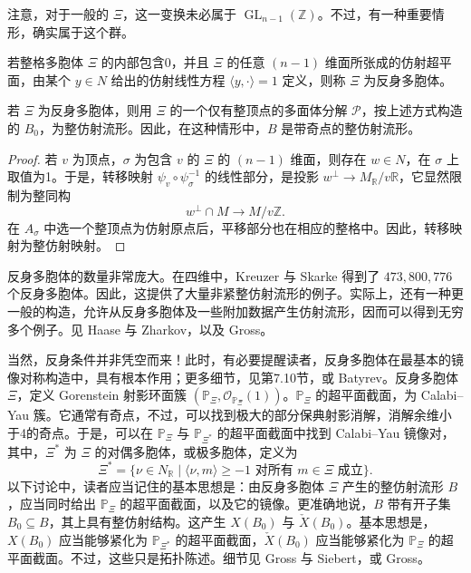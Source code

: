 注意，对于一般的 $\Xi$，这一变换未必属于 $\operatorname{GL}_{n-1}(\mathbb Z)$。不过，有一种重要情形，确实属于这个群。

\begin{definition}\label{def:6.80}
若整格多胞体 $\Xi$ 的内部包含0，并且 $\Xi$ 的任意 $(n-1)$ 维面所张成的仿射超平面，由某个 $y\in N$ 给出的仿射线性方程 $\langle y,\cdot\rangle=1$ 定义，则称 $\Xi$ 为反身多胞体。
\end{definition}

\begin{proposition}\label{prop:6.81}
若 $\Xi$ 为反身多胞体，则用 $\Xi$ 的一个仅有整顶点的多面体分解 $\mathcal P$，按上述方式构造的 $B_0$，为整仿射流形。因此，在这种情形中，$B$ 是带奇点的整仿射流形。
\end{proposition}
\begin{proof}
若 $v$ 为顶点，$\sigma$ 为包含 $v$ 的 $\Xi$ 的 $(n-1)$ 维面，则存在 $w\in N$，在 $\sigma$ 上取值为1。于是，转移映射 $\psi_v\circ\psi_\sigma^{-1}$ 的线性部分，是投影 $w^\perp\to M_{\mathbb R}/v\mathbb R$，它显然限制为整同构
\[
w^\perp\cap M\longrightarrow M/v\mathbb Z.
\]
在 $A_\sigma$ 中选一个整顶点为仿射原点后，平移部分也在相应的整格中。因此，转移映射为整仿射映射。
\end{proof}

反身多胞体的数量非常庞大。在四维中，Kreuzer 与 Skarke 得到了 $473{,}800{,}776$ 个反身多胞体。因此，这提供了大量非紧整仿射流形的例子。实际上，还有一种更一般的构造，允许从反身多胞体及一些附加数据产生仿射流形，因而可以得到无穷多个例子。见 Haase 与 Zharkov，以及 Gross。

当然，反身条件并非凭空而来！此时，有必要提醒读者，反身多胞体在最基本的镜像对称构造中，具有根本作用；更多细节，见第7.10节，或 Batyrev。反身多胞体 $\Xi$，定义 Gorenstein 射影环面簇 $(\mathbb P_\Xi,\mathcal O_{\mathbb P_\Xi}(1))$。$\mathbb P_\Xi$ 的超平面截面，为 Calabi--Yau 簇。它通常有奇点，不过，可以找到极大的部分保典射影消解，消解余维小于4的奇点。于是，可以在 $\mathbb P_\Xi$ 与 $\mathbb P_{\Xi^*}$ 的超平面截面中找到 Calabi--Yau 镜像对，其中，$\Xi^*$ 为 $\Xi$ 的对偶多胞体，或极多胞体，定义为
\[
\Xi^*=\{\nu\in N_{\mathbb R}\mid
\langle\nu,m\rangle\geq-1\text{ 对所有 }m\in\Xi\text{ 成立}\}.
\]
以下讨论中，读者应当记住的基本思想是：由反身多胞体 $\Xi$ 产生的整仿射流形 $B$，应当同时给出 $\mathbb P_\Xi$ 的超平面截面，以及它的镜像。更准确地说，$B$ 带有开子集 $B_0\subseteq B$，其上具有整仿射结构。这产生 $X(B_0)$ 与 $\check X(B_0)$。基本思想是，$X(B_0)$ 应当能够紧化为 $\mathbb P_{\Xi^*}$ 的超平面截面，$\check X(B_0)$ 应当能够紧化为 $\mathbb P_\Xi$ 的超平面截面。不过，这些只是拓扑陈述。细节见 Gross 与 Siebert，或 Gross。

